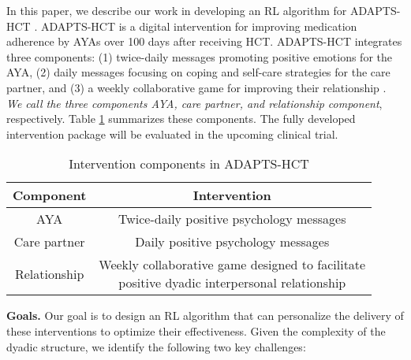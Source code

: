 
In this paper, we describe our work in developing an RL algorithm for ADAPTS-HCT \cite{shani2024tips}. ADAPTS-HCT is a digital intervention for improving medication adherence by AYAs  over 100 days after receiving HCT. ADAPTS-HCT integrates three components: (1) twice-daily messages promoting positive emotions for the AYA, (2) daily messages focusing on coping and self-care strategies for the care partner, and (3) a weekly collaborative game for improving their relationship \cite{shani2024tips}. \textit{We call the three components AYA, care partner, and relationship component}, respectively. Table \ref{tab:interventions} summarizes these components. The fully developed intervention package will be evaluated in the upcoming clinical trial.




\begin{table}[h]
\centering
\caption{Intervention components in ADAPTS-HCT}
\begin{tabular}{c|c}
\hline
\textbf{Component} & \textbf{Intervention} \\
\hline
AYA & Twice-daily positive psychology messages \\
\hline
Care partner & Daily positive psychology messages \\
\hline
Relationship & \makecell[c]{Weekly collaborative game designed to facilitate\\ positive dyadic interpersonal relationship}\\
\hline
\end{tabular}
\label{tab:interventions}
\end{table}


\textbf{Goals.} Our goal is to design an RL algorithm that can personalize the delivery of these interventions to optimize their effectiveness. Given the complexity of the dyadic structure, we identify the following two key challenges:

